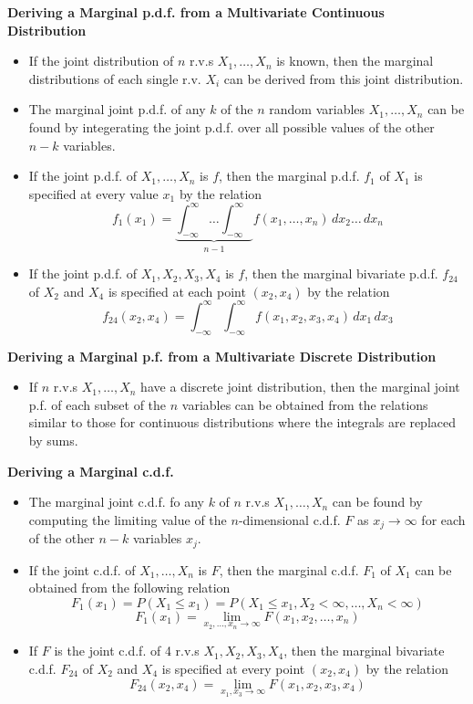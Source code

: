\documentclass[11pt]{article}
\begin{document}
\textbf{Deriving a Marginal p.d.f. from a Multivariate Continuous Distribution}
\begin{itemize}
    \item If the joint distribution of \(n\) r.v.s \(X_1, \ldots, X_n\) is known, then the 
    marginal distributions of each single r.v. \(X_i\) can be derived from this joint 
    distribution.
    \item The marginal joint p.d.f. of any $k$ of the $n$ random variables \(X_1, \ldots, X_n\)
    can be found by integerating the joint p.d.f. over all possible values of the other \(n-k\)
    variables. 
    \item If the joint p.d.f. of \(X_1, \ldots, X_n\) is \(f\), then the marginal p.d.f. 
    \(f_1\) of \(X_1\) is specified at every value \(x_1\) by the relation 
    \[f_1(x_1)=\underbrace{\int_{-\infty}^{\infty} \ldots \int_{-\infty}^{\infty}}_{n-1} f(x_1,
    \ldots, x_n) \,dx_2 \ldots \,dx_n\]
    \item If the joint p.d.f. of \(X_1, X_2, X_3, X_4\) is \(f\), then the marginal bivariate 
    p.d.f. \(f_{24}\) of \(X_2\) and \(X_4\) is specified at each point \((x_2, x_4)\) by the 
    relation 
    \[f_{24}(x_2, x_4)= \int_{-\infty}^{\infty} \int_{-\infty}^{\infty} f(x_1, x_2, x_3, x_4) 
    \,dx_1 \,dx_3\]
\end{itemize}

\textbf{Deriving a Marginal p.f. from a Multivariate Discrete Distribution}
\begin{itemize}
    \item If \(n\) r.v.s \(X_1, \ldots, X_n\) have a discrete joint distribution, then the 
    marginal joint p.f. of each subset of the $n$ variables can be obtained from the relations
    similar to those for continuous distributions where the integrals are replaced by sums.
\end{itemize}

\textbf{Deriving a Marginal c.d.f.}
\begin{itemize}
    \item The marginal joint c.d.f. fo any $k$ of $n$ r.v.s \(X_1, \ldots, X_n\) can be found 
    by computing the limiting value of the $n$-dimensional c.d.f. $F$ as $x_j \to \infty$ for 
    each of the other $n-k$ variables $x_j$. 
    \item If the joint c.d.f. of \(X_1, \ldots, X_n\) is \(F\), then the marginal c.d.f. 
    \(F_1\) of \(X_1\) can be obtained from the following relation
    \[F_1(x_1)=P(X_1 \le x_1) = P(X_1 \le x_1, X_2 < \infty, \ldots, X_n < \infty)\]
    \[F_1(x_1)=\lim_{x_2, \ldots, x_n \to \infty} F(x_1, x_2, \ldots, x_n) \]
    \item If $F$ is the joint c.d.f. of 4 r.v.s $X_1, X_2, X_3, X_4$, then the marginal 
    bivariate c.d.f. $F_{24}$ of $X_2$ and $X_4$ is specified at every point $(x_2, x_4)$ by
    the relation 
    \[F_{24}(x_2, x_4) = \lim_{x_1, x_3 \to \infty} F(x_1, x_2, x_3, x_4)\]
\end{itemize}
\end{document}
